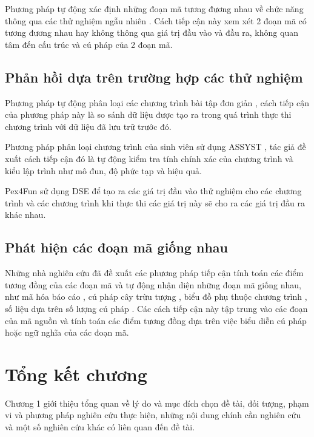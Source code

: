 	Phương pháp tự động xác định những đoạn mã tương đương nhau về chức năng thông qua các thử nghiệm ngẫu nhiên \cite{jiang2009automatic}. Cách tiếp cận này xem xét 2 đoạn mã có tương đương nhau hay không thông qua giá trị đầu vào và đầu ra, không quan tâm đến cấu trúc và cú pháp của 2 đoạn mã.
	
	\subsection{Phản hồi dựa trên trường hợp các thử nghiệm}
	Phương pháp tự động phân loại các chương trình bài tập đơn giản \cite{hext1969automatic}, cách tiếp cận của phương pháp này là so sánh dữ liệu được tạo ra trong quá trình thực thi chương trình với dữ liệu đã lưu trữ trước đó. 
	
	Phương pháp phân loại chương trình của sinh viên sử dụng ASSYST \cite{jackson1997grading}, tác giả đề xuất cách tiếp cận đó là tự động kiểm tra tính chính xác của chương trình và kiểu lập trình như mô đun, độ phức tạp và hiệu quả.
	
	Pex4Fun sử dụng DSE để tạo ra các giá trị đầu vào thử nghiệm cho các chương trình và các chương trình khi thực thi các giá trị này sẽ cho ra các giá trị đầu ra khác nhau.
	
	\subsection{Phát hiện các đoạn mã giống nhau}
	Những nhà nghiên cứu đã đề xuất các phương pháp tiếp cận tính toán các điểm tương đồng của các đoạn mã và tự động nhận diện những đoạn mã giống nhau, như mã hóa báo cáo \cite{kamiya2002ccfinder}, cú pháp cây trừu tượng \cite{baxter1998clone}, biểu đồ phụ thuộc chương trình \cite{komondoor2001using}, số liệu dựa trên số lượng cú pháp \cite{dang2012xiao} \cite{merlo2004linear}. Các cách tiếp cận này tập trung vào các đoạn của mã nguồn và tính toán các điểm tương đồng dựa trên việc biểu diễn cú pháp hoặc ngữ nghĩa của các đoạn mã.
	 
	
	
\section*{Tổng kết chương}
Chương 1 giới thiệu tổng quan về lý do và mục đích chọn đề tài, đối tượng, phạm vi và phương pháp nghiên cứu thực hiện, những nội dung chính cần nghiên cứu và một số nghiên cứu khác có liên quan đến đề tài.




